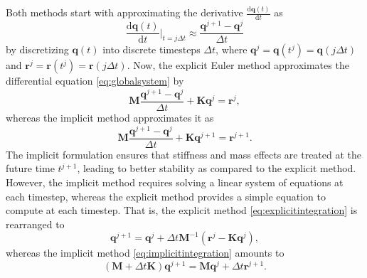 \documentclass[a4paper,11pt]{article}
\numberwithin{equation}{section}
\newcommand\matr[1]{\ensuremath{\boldsymbol{\mathbf{#1}}}}
\newcommand\vect[1]{\ensuremath{\bm{#1}}}
\begin{document}
{Both methods start with approximating the derivative $\frac{\mathrm{d}\vect{q}(t)}{\mathrm{d}t}$ as \begin{equation}
	\frac{\mathrm{d}\vect{q}(t)}{\mathrm{d}t}\Biggr|_{t=j\Delta t} \approx \frac{\vect{q}^{j+1}-\vect{q}^{j}}{\Delta t}
\end{equation} by discretizing $\vect{q}(t)$ into discrete timesteps $\Delta t$, where $\vect{q}^j = \vect{q}(t^j) =\vect{q}(j\Delta t)$ and $\vect{r}^j = \vect{r}(t^j) = \vect{r}(j\Delta t)$. Now, the explicit Euler method approximates the differential equation \cref{eq:globalsystem} by \begin{equation}\label{eq:explicitintegration}
\matr{M}\frac{\vect{q}^{j+1}-\vect{q}^{j}}{\Delta t} + \matr{K}\vect{q}^j = \vect{r}^j,
\end{equation} whereas the implicit method approximates it as 
\begin{equation}
\label{eq:implicitintegration}
\matr{M}\frac{\vect{q}^{j+1}-\vect{q}^{j}}{\Delta t} + \matr{K}\vect{q}^{j+1} = \vect{r}^{j+1}.
\end{equation} The implicit formulation ensures that stiffness and mass effects are treated at the future time $t^{j+1}$, leading to better stability as compared to the explicit method. However, the implicit method requires solving a linear system of equations at each timestep, whereas the explicit method provides a simple equation to compute at each timestep. That is, the explicit method \cref{eq:explicitintegration} is rearranged to \begin{equation}
\vect{q}^{j+1} = \vect{q}^j + \Delta t \matr{M}^{-1}\left(\vect{r}^j - \matr{K}\vect{q}^j\right),
\end{equation} whereas the implicit method \cref{eq:implicitintegration} amounts to \begin{equation}
\left(\matr{M} + \Delta t \matr{K}\right)\vect{q}^{j+1} = \matr{M}\vect{q}^j + \Delta t \vect{r}^{j+1}.
\end{equation}
}
\end{document}
